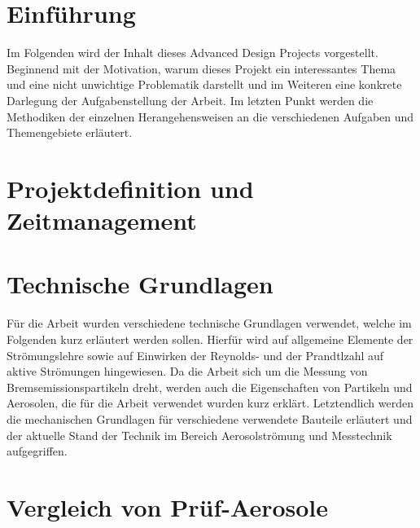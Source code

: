 \chapter{Einf\"{u}hrung}\label{ch:introduction}
Im Folgenden wird der Inhalt dieses Advanced Design Projects vorgestellt. Beginnend mit der Motivation, warum dieses Projekt ein interessantes Thema und eine nicht unwichtige Problematik darstellt und im Weiteren eine konkrete Darlegung der Aufgabenstellung der Arbeit. Im letzten Punkt werden die Methodiken der einzelnen Herangehensweisen an die verschiedenen Aufgaben und Themengebiete erl\"{a}utert. 





\chapter{Projektdefinition und Zeitmanagement}\label{ch:project}




\chapter{Technische Grundlagen}\label{ch:foundations}
F\"{u}r die Arbeit wurden verschiedene technische Grundlagen verwendet, welche im Folgenden kurz erl\"{a}utert werden sollen. Hierf\"{u}r wird auf allgemeine Elemente der Str\"{o}mungslehre sowie auf Einwirken der Reynolds- und der Prandtlzahl auf aktive Str\"{o}mungen hingewiesen. Da die Arbeit sich um die Messung von Bremsemissionspartikeln dreht, werden auch die Eigenschaften von Partikeln und Aerosolen, die f\"{u}r die Arbeit verwendet wurden kurz erkl\"{a}rt. Letztendlich werden die mechanischen Grundlagen f\"{u}r verschiedene verwendete Bauteile erl\"{a}utert und der aktuelle Stand der Technik im Bereich Aerosolstr\"{o}mung und Messtechnik aufgegriffen.






\chapter{Vergleich von Pr\"{u}f-Aerosole}\label{ch:aerosol}






